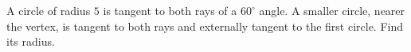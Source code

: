 A circle of radius $5$ is tangent to both rays of a $60^\circ$ angle. A smaller circle, nearer the vertex, is tangent to both rays and externally tangent to the first circle. Find its radius.
